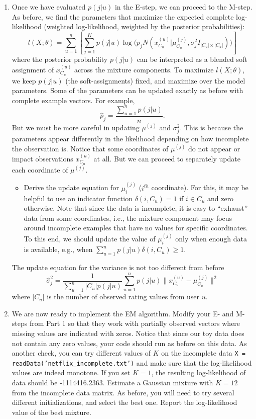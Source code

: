 \begin{enumerate}
\begin{enumerate}
\item Once we have evaluated $p(j|u)$ in the E-step, we can proceed to the M-step. As before, we find the parameters that maximize the expected complete log-likelihood (weighted log-likelihood, weighted by the posterior probabilities):
$$ l(X;\theta) = \sum_{u=1}^n \left[ \sum^{K}_{j=1} p(j|u) \log\bigl( p_j N(x^{(u)}_{C_u} | \mu^{(j)}_{C_u}, \sigma^2_j I_{|C_u| \times |C_u|} ) \bigr) \right]$$
where the posterior probability $p(j|u)$ can be interpreted as a blended soft assignment of $x^{(u)}_{C_u}$ across the mixture components. To maximize $l(X;\theta)$, we keep $p(j|u)$ (the soft-assignments) fixed, and maximize over the model parameters. Some of the parameters can be updated exactly as before with complete example vectors. For example,
$$
\hat p_j = \frac{\sum_{u=1}^n p(j|u)}{n}.
$$
But we must be more careful in updating $\mu^{(j)}$ and $\sigma_j^2$. This is because the parameters appear differently in the likelihood depending on how incomplete the observation is. Notice that some coordinates of $\mu^{(j)}$ do not appear or impact observations $x^{(u)}_{C_u}$ at all. But we can proceed to separately update each coordinate of $\mu^{(j)}$. 
\begin{itemize}
\item Derive the update equation for $\mu^{(j)}_i$ ($i^{th}$ coordinate). For this, it may be helpful to use an indicator function $\delta(i,C_u)=1$ if $i\in C_u$ and zero otherwise. Note that since the data is incomplete, it is easy to ``exhaust'' data from some coordinates, i.e., the mixture component may focus around incomplete examples that have no values for specific coordinates. To this end, we should update the value of $\mu^{(j)}_i$ only when enough data is available, e.g., when 
$\sum_{u=1}^n p(j|u)\delta(i,C_u)\geq 1$. 
\end{itemize}
The update equation for the variance is not too different from before
$$
\hat\sigma_j^2 = \frac{1}{\sum_{u=1}^n |C_u|p(j|u)} 
\sum_{u=1}^n p(j|u)\|x^{(u)}_{C_u}-\hat\mu^{(j)}_{C_u}\|^2
$$
where $|C_u|$ is the number of observed rating values from user $u$.

\item We are now ready to implement the EM algorithm. Modify your E- and M-steps from Part 1 so that they work with partially observed vectors where missing values are indicated with zeros. Notice that since our toy data does not contain any zero values, your code should run as before on this data. As another check, you can try different values of $K$ on the incomplete data \texttt{X = readData('netflix\_incomplete.txt')} and make sure that the log-likelihood values are indeed monotone. If you set $K=1$, the resulting log-likelihood of data should be -1114416.2363. Estimate a Gaussian mixture with $K=12$ from the incomplete data matrix. As before, you will need to try several different initializations, and select the best one. Report the log-likelihood value of the best mixture. 


\end{enumerate}
\end{enumerate}
